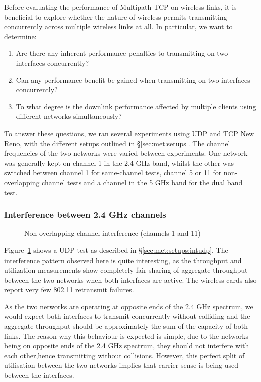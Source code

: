 Before evaluating the performance of Multipath TCP on wireless links, it is
beneficial to explore whether the nature of wireless permits transmitting
concurrently across multiple wireless links at all. In particular, we want
to determine:

\begin{enumerate}
  \item Are there any inherent performance penalties to transmitting on two
    interfaces concurrently?
  \item Can any performance benefit be gained when transmitting on two
    interfaces concurrently?
  \item To what degree is the downlink performance affected by multiple clients
    using different networks simultaneously?
\end{enumerate}

To answer these questions, we ran several experiments using UDP and TCP New 
Reno, with the different setups outlined in \S\ref{sec:met:setups}.      %
The channel frequencies of the two networks were varied between experiments. One
network was generally kept on channel 1 in the 2.4 GHz band, whilst the other
was switched between channel 1 for same-channel tests, channel 5 or 11 for
non-overlapping channel tests and a channel in the 5 GHz band for the dual band 
test. 

\subsubsection{Interference between 2.4 GHz channels}

\begin{figure}[h]
 \centering
 
 \caption{Non-overlapping channel interference (channels 1 and 11)}\label{graph:cc-interference}
\end{figure}

Figure~\ref{graph:cc-interference} shows a UDP test as described in 
\S\ref{sec:met:setups:intudp}.
The interference pattern observed here is quite interesting, as the throughput
and utilization measurements show completely fair sharing of aggregate
throughput between the two networks when both interfaces are active. The
wireless cards also report very few 802.11 retransmit failures.

As the two networks are operating at opposite ends of the 2.4 GHz spectrum, we
would expect both interfaces to transmit concurrently without colliding
and the aggregate throughput should be approximately the sum of the capacity of
both links. The reason why this behaviour is expected is simple, due to the networks being on opposite ends of the 2.4 GHz spectrum, they should not interfere with each other,hence transmitting without collisions. However, this perfect split of utilisation between the two networks implies that carrier sense is being used between the interfaces.

